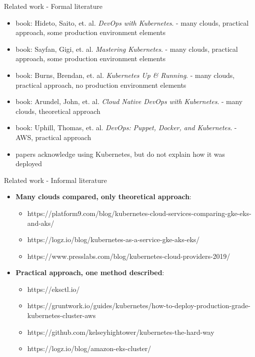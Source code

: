 \documentclass{beamer}
\begin{document}
\begin{frame}{Related work - Formal literature}%
\begin{itemize}
	\item book: Hideto, Saito, et. al. \textit{DevOps with Kubernetes}. - many clouds, practical approach, some production environment elements
	\item book: Sayfan, Gigi, et. al. \textit{Mastering Kubernetes}. - many clouds, practical approach, some production environment elements
	\item book: Burns, Brendan, et. al. \textit{Kubernetes Up \& Running}. - many clouds, practical approach, no production environment elements
	\item book: Arundel, John, et. al. \textit{Cloud Native DevOps with Kubernetes}. - many clouds, theoretical approach
	\item book: Uphill, Thomas, et. al. \textit{DevOps: Puppet, Docker, and Kubernetes}. - AWS, practical approach
	\item papers acknowledge using Kubernetes, but do not explain how it was deployed
\end{itemize}
\end{frame}

\begin{frame}{Related work - Informal literature}%
\begin{itemize}
	\item \textbf{Many clouds compared, only theoretical approach}:
	\begin{itemize}
		\item https://platform9.com/blog/kubernetes-cloud-services-comparing-gke-eks-and-aks/
		\item https://logz.io/blog/kubernetes-as-a-service-gke-aks-eks/
		\item https://www.presslabs.com/blog/kubernetes-cloud-providers-2019/
	\end{itemize}
	\item \textbf{Practical approach, one method described}:
	\begin{itemize}
		\item https://eksctl.io/
		\item https://gruntwork.io/guides/kubernetes/how-to-deploy-production-grade-kubernetes-cluster-aws
		\item https://github.com/kelseyhightower/kubernetes-the-hard-way
		\item https://logz.io/blog/amazon-eks-cluster/
	\end{itemize}
\end{itemize}
\end{frame}
\end{document}
